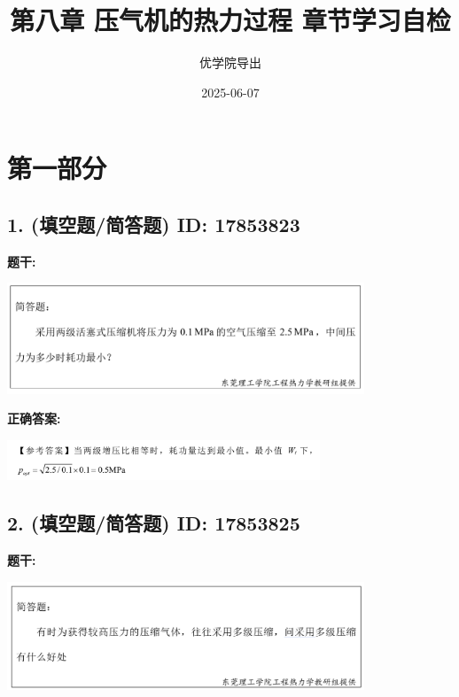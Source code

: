 \documentclass[12pt]{article}
\title{第八章 压气机的热力过程 章节学习自检}
\author{优学院导出}
\date{2025-06-07}
\begin{document}
\maketitle

\section*{第一部分}
\hrulefill

\subsection*{1. (填空题/简答题) \small ID: 17853823}

\textbf{题干:}


\begin{center}\includegraphics[width=0.8\textwidth, height=0.25\textheight, keepaspectratio]{question_1_17853823/title_img_1.png}\end{center}

\textbf{正确答案:}

\begin{center}\includegraphics[width=0.7\textwidth, height=0.2\textheight, keepaspectratio]{question_1_17853823/correct_answer_1_img_1.png}\end{center}

\vspace{0.5em}\hrulefill\vspace{1em}

\subsection*{2. (填空题/简答题) \small ID: 17853825}

\textbf{题干:}


\begin{center}\includegraphics[width=0.8\textwidth, height=0.25\textheight, keepaspectratio]{question_2_17853825/title_img_1.png}\end{center}
\end{document}
